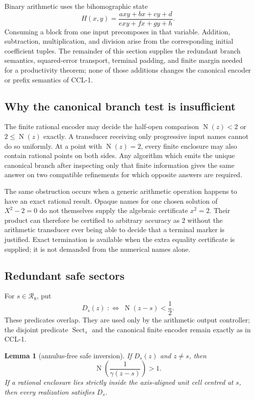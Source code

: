 \documentclass[10pt]{article}
\newtheorem{lemma}[theorem]{Lemma}
\theoremstyle{definition}
\theoremstyle{remark}
\newcommand{\Norm}{\operatorname{N}}
\begin{document}
Binary arithmetic uses the bihomographic state
\[
H(x,y)=\frac{axy+bx+cy+d}{exy+fx+gy+h}.
\]
Consuming a block from one input precomposes in that variable.  Addition,
subtraction, multiplication, and division arise from the corresponding
initial coefficient tuples.  The remainder of this section supplies the
redundant branch semantics, squared-error transport, terminal padding, and
finite margin needed for a productivity theorem; none of those additions
changes the canonical encoder or prefix semantics of CCL-1.

\subsection{Why the canonical branch test is insufficient}

The finite rational encoder may decide the half-open comparison $\Norm(z)<2$ or $2\le\Norm(z)$ exactly.  A transducer receiving only progressive input names cannot do so uniformly.  At a point with $\Norm(z)=2$, every finite enclosure may also contain rational points on both sides.  Any algorithm which emits the unique canonical branch after inspecting only that finite information gives the same answer on two compatible refinements for which opposite answers are required.

The same obstruction occurs when a generic arithmetic operation happens to have an exact rational result.  Opaque names for one chosen solution of $X^2-2=0$ do not themselves supply the algebraic certificate $x^2=2$.  Their product can therefore be certified to arbitrary accuracy as $2$ without the arithmetic transducer ever being able to decide that a terminal marker is justified.  Exact termination is available when the extra equality certificate is supplied; it is not demanded from the numerical names alone.

\subsection{Redundant safe sectors}

For $s\in\mathcal R_8$, put
\[
 D_s(z)\;:\Longleftrightarrow\;\Norm(z-s)<\frac12.
\tag{2.2}
\]
These predicates overlap.  They are used only by the arithmetic output
controller; the disjoint predicate $\operatorname{Sect}_s$ and the canonical
finite encoder remain exactly as in CCL-1.

\begin{lemma}[annulus-free safe inversion]\label{lem:redundant-safe-inversion}
If $D_s(z)$ and $z\ne s$, then
\[
 \Norm\!\left(\frac1{\gamma(z-s)}\right)>1.
\tag{2.3}
\]
If a rational enclosure lies strictly inside the axis-aligned unit cell centred at $s$, then every realization satisfies $D_s$.
\end{lemma}
\end{document}
